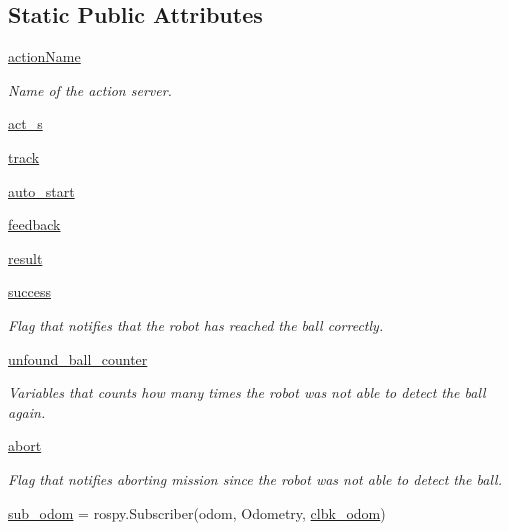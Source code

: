 \subsection*{Static Public Attributes}
\begin{DoxyCompactItemize}
\item 
\hyperlink{classtrack_1_1TrackAction_abb57579f14aa39d1cc0f4379382390a6}{action\+Name}
\begin{DoxyCompactList}\small\item\em Name of the action server. \end{DoxyCompactList}\item 
\hyperlink{classtrack_1_1TrackAction_ae1870a4393e99629a3835f563374152e}{act\+\_\+s}
\item 
\hyperlink{classtrack_1_1TrackAction_a3d89a5a6bf3daf63df4b690e4c9a84a8}{track}
\item 
\hyperlink{classtrack_1_1TrackAction_aeb30f796983b2999ad62d71535795668}{auto\+\_\+start}
\item 
\hyperlink{classtrack_1_1TrackAction_acce0064c9d83a91f00d92a854014cdf5}{feedback}
\item 
\hyperlink{classtrack_1_1TrackAction_ae62bfb3233b566df94fde636d8d26877}{result}
\item 
\hyperlink{classtrack_1_1TrackAction_a8c79189ba62cf316bffaa4c00b0320fe}{success}
\begin{DoxyCompactList}\small\item\em Flag that notifies that the robot has reached the ball correctly. \end{DoxyCompactList}\item 
\hyperlink{classtrack_1_1TrackAction_aabc16f100d1f260d6712d8d74e055fda}{unfound\+\_\+ball\+\_\+counter}
\begin{DoxyCompactList}\small\item\em Variables that counts how many times the robot was not able to detect the ball again. \end{DoxyCompactList}\item 
\hyperlink{classtrack_1_1TrackAction_a4fac0918d826dc6cbf110784c8fcda99}{abort}
\begin{DoxyCompactList}\small\item\em Flag that notifies aborting mission since the robot was not able to detect the ball. \end{DoxyCompactList}\item 
\hyperlink{classtrack_1_1TrackAction_a4cbc03d130bcf2203bc68f37d02dc4c5}{sub\+\_\+odom} = rospy.\+Subscriber(\textquotesingle{}odom\textquotesingle{}, Odometry, \hyperlink{namespacetrack_ac547a00259cf9bddfb37b60063740e8d}{clbk\+\_\+odom})

\end{DoxyCompactItemize}
